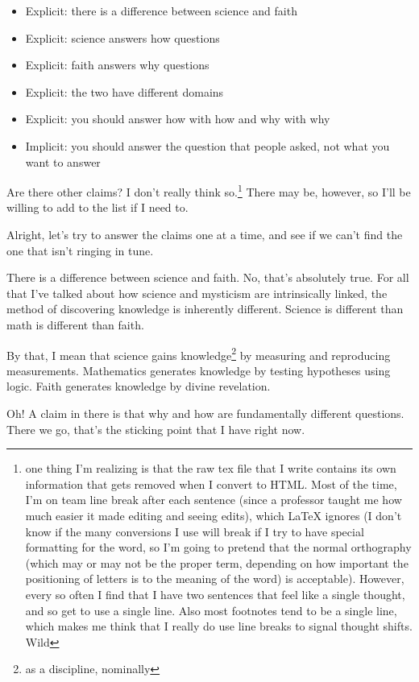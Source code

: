 \documentclass[12pt]{article}[titlepage]
\renewcommand{\,}{\textsuperscript{,}}
\begin{document}
\begin{itemize}
\item Explicit: there is a difference between science and faith
\item Explicit: science answers how questions
\item Explicit: faith answers why questions
\item Explicit: the two have different domains
\item Explicit: you should answer how with how and why with why
\item Implicit: you should answer the question that people asked, not what you want to answer
\end{itemize}

Are there other claims? I don't really think so.\footnote{one thing I'm realizing is that the raw tex file that I write contains its own information that gets removed when I convert to HTML. Most of the time, I'm on team line break after each sentence (since a professor taught me how much easier it made editing and seeing edits), which LaTeX ignores (I don't know if the many conversions I use will break if I try to have special formatting for the word, so I'm going to pretend that the normal orthography (which may or may not be the proper term, depending on how important the positioning of letters is to the meaning of the word) is acceptable). However, every so often I find that I have two sentences that feel like a single thought, and so get to use a single line.
Also most footnotes tend to be a single line, which makes me think that I really do use line breaks to signal thought shifts. Wild}
There may be, however, so I'll be willing to add to the list if I need to.

Alright, let's try to answer the claims one at a time, and see if we can't find the one that isn't ringing in tune.

There is a difference between science and faith.
No, that's absolutely true.
For all that I've talked about how science and mysticism are intrinsically linked, the method of discovering knowledge is inherently different.
Science is different than math is different than faith.

By that, I mean that science gains knowledge\footnote{as a discipline, nominally} by measuring and reproducing measurements.
Mathematics generates knowledge by testing hypotheses using logic.
Faith generates knowledge by divine revelation.

Oh! A claim in there is that why and how are fundamentally different questions.
There we go, that's the sticking point that I have right now.
\end{document}
